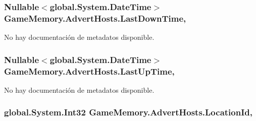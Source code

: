 \hypertarget{class_game_memory_1_1_advert_hosts_ae2a1fcae997b086b7029ae2739f69a8a}{
\subsubsection[{Last\-Down\-Time}]{\setlength{\rightskip}{0pt plus 5cm}Nullable$<$global.\-System.\-Date\-Time$>$ Game\-Memory.\-Advert\-Hosts.\-Last\-Down\-Time\hspace{0.3cm}{\ttfamily [get]}, {\ttfamily [set]}}}\label{class_game_memory_1_1_advert_hosts_ae2a1fcae997b086b7029ae2739f69a8a}


No hay documentación de metadatos disponible. 

\hypertarget{class_game_memory_1_1_advert_hosts_ac9286ac99bf2f9237cdf0ade0823ad81}{
\subsubsection[{Last\-Up\-Time}]{\setlength{\rightskip}{0pt plus 5cm}Nullable$<$global.\-System.\-Date\-Time$>$ Game\-Memory.\-Advert\-Hosts.\-Last\-Up\-Time\hspace{0.3cm}{\ttfamily [get]}, {\ttfamily [set]}}}\label{class_game_memory_1_1_advert_hosts_ac9286ac99bf2f9237cdf0ade0823ad81}


No hay documentación de metadatos disponible. 

\hypertarget{class_game_memory_1_1_advert_hosts_a001106f5700ae6ddd8db5d749eeceb52}{
\subsubsection[{Location\-Id}]{\setlength{\rightskip}{0pt plus 5cm}global.\-System.\-Int32 Game\-Memory.\-Advert\-Hosts.\-Location\-Id\hspace{0.3cm}{\ttfamily [get]}, {\ttfamily [set]}}}\label{class_game_memory_1_1_advert_hosts_a001106f5700ae6ddd8db5d749eeceb52}


